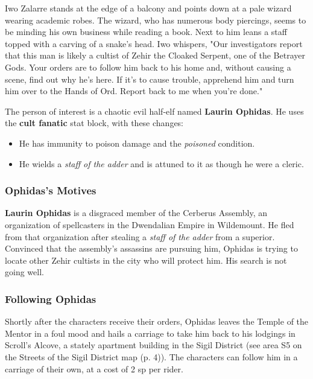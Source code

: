 \documentclass[letterpaper, 11pt, bg=full, twocolumn]{dndbook}
\begin{document}
\begin{DndReadAloud}
Iwo Zalarre stands at the edge of a balcony and points down at a pale wizard wearing academic robes. The wizard, who has numerous body piercings, seems to be minding his own business while reading a book. Next to him leans a staff topped with a carving of a snake's head.
Iwo whispers, "Our investigators report that this man is likely a cultist of Zehir the Cloaked Serpent, one of the Betrayer Gods. Your orders are to follow him back to his home and, without causing a scene, find out why he's here. If it's to cause trouble, apprehend him and turn him over to the Hands of Ord. Report back to me when you're done."
\end{DndReadAloud}

The person of interest is a chaotic evil half-elf named \textbf{Laurin Ophidas}. He uses the \textbf{cult fanatic} stat block, with these changes:

\begin{itemize}
\item He has immunity to poison damage and the \textit{poisoned} condition.
\item He wields a \textit{staff of the adder} and is attuned to it as though he were a cleric.
\end{itemize}

\subsubsection{Ophidas's Motives}

\textbf{Laurin Ophidas} is a disgraced member of the Cerberus Assembly, an organization of spellcasters in the Dwendalian Empire in Wildemount. He fled from that organization after stealing a \textit{staff of the adder} from a superior. Convinced that the assembly's assassins are pursuing him, Ophidas is trying to locate other Zehir cultists in the city who will protect him. His search is not going well.

\subsubsection{Following Ophidas}

Shortly after the characters receive their orders, Ophidas leaves the Temple of the Mentor in a foul mood and hails a carriage to take him back to his lodgings in Scroll's Alcove, a stately apartment building in the Sigil District (see area S5 on the Streets of the Sigil District map (p. 4)). The characters can follow him in a carriage of their own, at a cost of 2 sp per rider.
\end{document}
